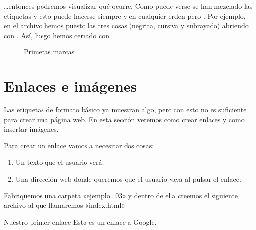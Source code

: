 \documentclass[a4paper,12pt,spanish]{sphinxmanual}
\begin{document}
…entonces podremos visualizar qué ocurre. Como puede verse se han mezclado las etiquetas y esto puede hacerse siempre y en cualquier orden pero . Por ejemplo, en el archivo hemos puesto las tres cosas (negrita, cursiva y subrayado) abriendo con . Así, luego hemos cerrado con 

\begin{figure}[htbp]
\centering
\capstart

\noindent{}
\caption{Primeras marcas}\label{\detokenize{index:id12}}\end{figure}


\chapter{Enlaces e imágenes}
\label{\detokenize{index:enlaces-e-imagenes}}
Las etiquetas de formato básico ya muestran algo, pero con esto no es suficiente para crear una página web. En esta sección veremos como crear enlaces y como insertar imágenes.

Para crear un enlace vamos a necesitar dos cosas:
\begin{enumerate}
\def\theenumi{\arabic{enumi}}
\def\labelenumi{\theenumi .}
\makeatletter\def\p@enumii{\p@enumi \theenumi .}\makeatother
\item {} 
Un texto que el usuario verá.

\item {} 
Una dirección web donde queremos que el usuario vaya al pulsar el enlace.

\end{enumerate}

Fabriquemos una carpeta «ejemplo\_03» y dentro de ella creemos el siguiente archivo al que llamaremos «index.html»

%
\begin{sphinxVerbatim}[commandchars=\\\{\}]
    Nuestro primer enlace
     Esto es un enlace a Google.
\end{sphinxVerbatim}
\end{document}
